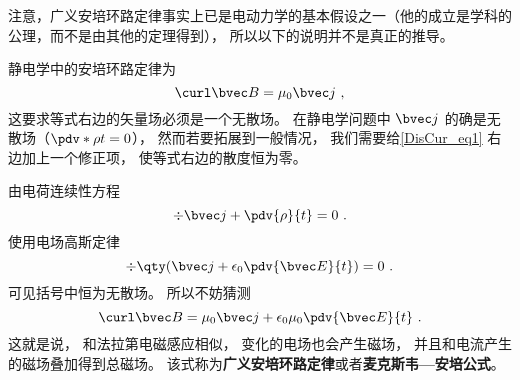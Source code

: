 注意，广义安培环路定律事实上已是电动力学的基本假设之一（他的成立是学科的公理，而不是由其他的定理得到）， 所以以下的说明并不是真正的推导。

静电学中的安培环路定律为
\begin{equation}\label{DisCur_eq1}
\curl\bvec B = \mu_0\bvec j~,
\end{equation}
这要求等式右边的矢量场必须是一个无散场。 在静电学问题中 $\bvec j$ 的确是无散场（$\pdv*{\rho}{t} = 0$）， 然而若要拓展到一般情况， 我们需要给\autoref{DisCur_eq1} 右边加上一个修正项， 使等式右边的散度恒为零。

由电荷连续性方程
\begin{equation}
\div \bvec j + \pdv{\rho}{t} = 0~.
\end{equation}
使用电场高斯定律
\begin{equation}
\div \qty(\bvec j + \epsilon_0\pdv{\bvec E}{t}) = 0~.
\end{equation}
可见括号中恒为无散场。 所以不妨猜测
\begin{equation}
\curl\bvec B = \mu_0\bvec j + \epsilon_0\mu_0\pdv{\bvec E}{t}~.
\end{equation}
这就是说， 和法拉第电磁感应相似， 变化的电场也会产生磁场， 并且和电流产生的磁场叠加得到总磁场。 该式称为\textbf{广义安培环路定律}或者\textbf{麦克斯韦—安培公式}。

